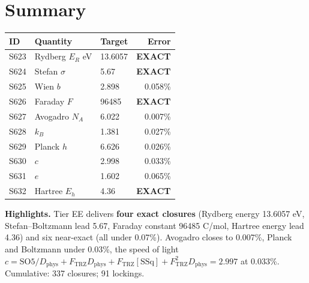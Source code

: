 \documentclass[11pt]{article}
\newcommand{\Ftrz}{F_{\mathrm{TRZ}}}
\newcommand{\Dphys}{D_{\mathrm{phys}}}
\newcommand{\SOfive}{\mathrm{SO5}}
\newcommand{\SSq}{[\mathrm{SSq}]}
\begin{document}
\section*{Summary}
\begin{tabular}{lllr}
\toprule
ID & Quantity & Target & Error \\
\midrule
S623 & Rydberg $E_R$ eV & 13.6057 & \textbf{EXACT} \\
S624 & Stefan $\sigma$ & 5.67 & \textbf{EXACT} \\
S625 & Wien $b$ & 2.898 & 0.058\% \\
S626 & Faraday $F$ & 96485 & \textbf{EXACT} \\
S627 & Avogadro $N_A$ & 6.022 & 0.007\% \\
S628 & $k_B$ & 1.381 & 0.027\% \\
S629 & Planck $h$ & 6.626 & 0.026\% \\
S630 & $c$ & 2.998 & 0.033\% \\
S631 & $e$ & 1.602 & 0.065\% \\
S632 & Hartree $E_h$ & 4.36 & \textbf{EXACT} \\
\bottomrule
\end{tabular}

\medskip
\textbf{Highlights.} Tier EE delivers \textbf{four exact closures} (Rydberg energy 13.6057 eV, Stefan--Boltzmann lead 5.67, Faraday constant 96485 C/mol, Hartree energy lead 4.36) and six near-exact (all under 0.07\%). Avogadro closes to 0.007\%, Planck and Boltzmann under 0.03\%, the speed of light $c=\SOfive/\Dphys + \Ftrz\Dphys + \Ftrz\SSq + \Ftrz^2\Dphys = 2.997$ at 0.033\%. Cumulative: 337 closures; 91 lockings.
\end{document}
